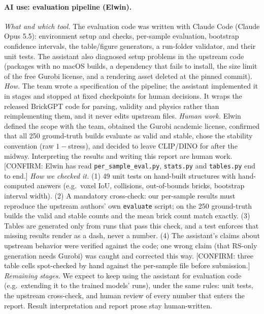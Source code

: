 
\paragraph{AI use: evaluation pipeline (Elwin).}
\emph{What and which tool.} The evaluation code was written with Claude Code (Claude Opus 5.5): environment
setup and checks, per-sample evaluation, bootstrap confidence intervals, the table/figure generators, a run-folder
validator, and their unit tests. The assistant also diagnosed setup problems in the upstream code (packages with
no macOS builds, a dependency that fails to install, the size limit of the free Gurobi license, and a rendering
asset deleted at the pinned commit).
\emph{How.} The team wrote a specification of the pipeline; the assistant implemented it in stages and stopped at
fixed checkpoints for human decisions. It wraps the released BrickGPT code for parsing, validity and physics
rather than reimplementing them, and it never edits upstream files.
\emph{Human work.} Elwin defined the scope with the team, obtained the Gurobi academic license, confirmed that all
250 ground-truth builds evaluate as valid and stable, chose the stability convention (raw $1-$stress), and decided
to leave CLIP/DINO for after the midway. Interpreting the results and writing this report are human work.
[CONFIRM: Elwin has read \texttt{per\_sample\_eval.py}, \texttt{stats.py} and \texttt{tables.py} end to end.]
\emph{How we checked it.} (1) 49 unit tests on hand-built structures with hand-computed answers (e.g.\ voxel IoU,
collisions, out-of-bounds bricks, bootstrap interval width). (2) A mandatory cross-check: our per-sample results
must reproduce the upstream authors' own \texttt{evaluate} script; on the 250 ground-truth builds the valid and
stable counts and the mean brick count match exactly. (3) Tables are generated only from runs that pass this
check, and a test enforces that missing results render as a dash, never a number. (4) The assistant's claims
about upstream behavior were verified against the code; one wrong claim (that RS-only generation needs
Gurobi) was caught and corrected this way. [CONFIRM: three table cells spot-checked by hand against the
per-sample file before submission.]
\emph{Remaining stages.} We expect to keep using the assistant for evaluation code (e.g.\ extending it to the
trained models' runs), under the same rules: unit tests, the upstream cross-check, and human review of every
number that enters the report. Result interpretation and report prose stay human-written.

